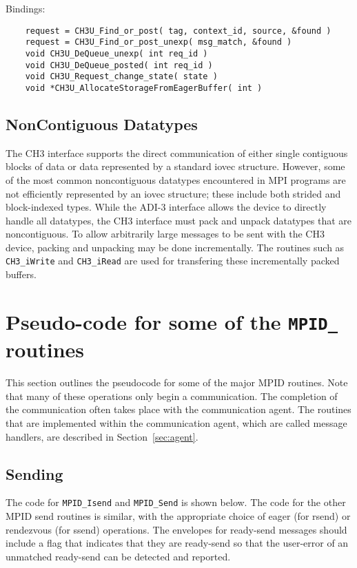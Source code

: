 \documentclass{article}
\def\code{\begingroup\makeustext\eatcode}
\def\eatcode#1{\texttt{#1}\endgroup}
\begin{document}
Bindings:
\begin{verbatim}
    request = CH3U_Find_or_post( tag, context_id, source, &found )
    request = CH3U_Find_or_post_unexp( msg_match, &found )
    void CH3U_DeQueue_unexp( int req_id )
    void CH3U_DeQueue_posted( int req_id )
    void CH3U_Request_change_state( state )
    void *CH3U_AllocateStorageFromEagerBuffer( int )
\end{verbatim}

\subsection{NonContiguous Datatypes}
The CH3 interface supports the direct communication of either single
contiguous blocks of data or data represented by a standard iovec
structure.  However, some of the most common noncontiguous datatypes
encountered in MPI programs are not efficiently represented by an
iovec structure; these include both strided and block-indexed types.
While the ADI-3 interface allows the device to directly handle all
datatypes, the CH3 interface must pack and unpack datatypes that are
noncontiguous.  To allow arbitrarily large messages to be sent with
the CH3 device, packing and unpacking may be done incrementally.  The
routines such as \code{CH3\_iWrite} and \code{CH3\_iRead} are used for
transfering these incrementally packed buffers.

\section{Pseudo-code for some of the \code{MPID\_} routines}
This section outlines the pseudocode for some of the major MPID
routines.
Note that many of these operations only begin a communication.  The
completion of the communication often takes place with the
communication agent.  The routines that are implemented within the
communication agent, which are called message handlers, are described
in Section~\ref{sec:agent}.

\subsection{Sending}
The code for \code{MPID_Isend} and \code{MPID_Send} is shown below.  The code
for the other 
MPID send routines is similar, with the appropriate choice of eager
(for rsend) or rendezvous (for ssend) operations.  
The envelopes for ready-send messages should include
a flag that indicates that they are ready-send so that the user-error of an
unmatched ready-send can be detected and reported.
\end{document}
